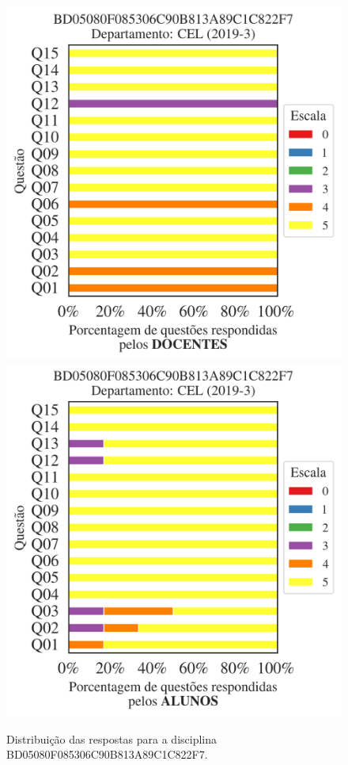 \documentclass[a4paper,10pt]{article}
\begin{document}
\begin{figure}[h]
\centering
\includegraphics[width=0.485\linewidth]{analise_disciplina_departamento_CEL_BD05080F085306C90B813A89C1C822F7_docentes.png}
\includegraphics[width=0.485\linewidth]{analise_disciplina_departamento_CEL_BD05080F085306C90B813A89C1C822F7_alunos.png}
\caption{\label{fig:analise_geral_departamento}                Distribuição das respostas para a disciplina BD05080F085306C90B813A89C1C822F7. }
\end{figure}
\end{document}
